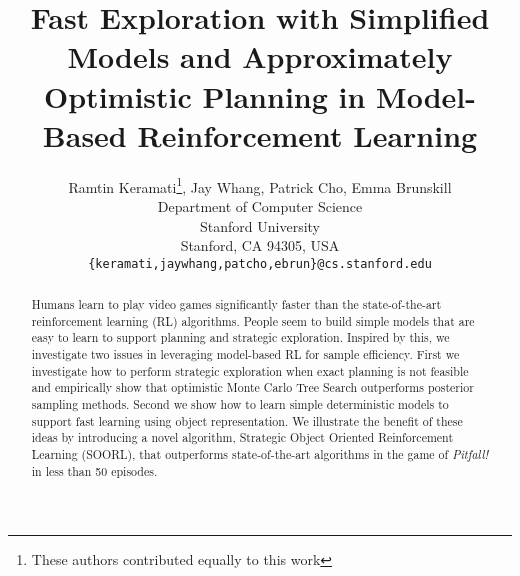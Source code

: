 \documentclass{article} %
\title{Fast Exploration with Simplified Models and Approximately Optimistic Planning in Model-Based Reinforcement Learning}
\author{Ramtin Keramati\thanks{These authors contributed equally to this work}, Jay Whang\footnotemark[1], Patrick Cho\footnotemark[1], Emma Brunskill \\
Department of Computer Science\\
Stanford University\\
Stanford, CA 94305, USA \\
\texttt{\{keramati,jaywhang,patcho,ebrun\}@cs.stanford.edu} \\
}
\newcommand{\danote}[1]{\textcolor{blue}{\textbf{DA: #1}}}
\begin{document}
\maketitle
\begin{abstract}


Humans learn to play video games significantly faster than the state-of-the-art reinforcement learning (RL) algorithms. People seem to build simple models that are easy to learn 
to support planning and strategic exploration. Inspired by this, we investigate two issues in leveraging model-based RL for sample efficiency. First we investigate 
how to perform strategic exploration when exact planning is not feasible and empirically show that optimistic Monte Carlo Tree Search outperforms posterior sampling methods. Second we show how to learn simple deterministic models to support fast learning using object representation.
We illustrate the benefit of these ideas by introducing a novel algorithm, Strategic Object Oriented Reinforcement Learning (SOORL), that outperforms state-of-the-art algorithms in the game of \textit{Pitfall!} in less than 50 episodes.

\end{abstract}















\end{document}
